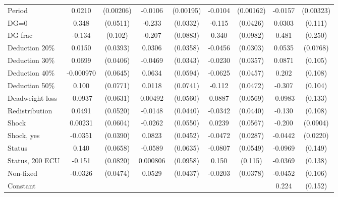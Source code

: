 \begin{tabular}{l|cccccc|cc}
Period          &   0.0210\sym{***}&(0.00206)&  -0.0106\sym{***}&(0.00195)&  -0.0104\sym{***}&(0.00162)&  -0.0157\sym{***}&(0.00323)\\
DG=0          &    0.348\sym{***}& (0.0511)&   -0.233\sym{***}& (0.0332)&   -0.115\sym{***}& (0.0426)&   0.0303         &  (0.111)\\
DG frac         &   -0.134         &  (0.102)&   -0.207\sym{**} & (0.0883)&    0.340\sym{***}& (0.0982)&    0.481\sym{*}  &  (0.250)\\
Deduction 20\%&   0.0150         & (0.0393)&   0.0306         & (0.0358)&  -0.0456         & (0.0303)&   0.0535         & (0.0768)\\
Deduction 30\%&   0.0699\sym{*}  & (0.0406)&  -0.0469         & (0.0343)&  -0.0230         & (0.0357)&   0.0871         &  (0.105)\\
Deduction 40\%&-0.000970         & (0.0645)&   0.0634         & (0.0594)&  -0.0625         & (0.0457)&    0.202\sym{*}  &  (0.108)\\
Deduction 50\%&    0.100         & (0.0771)&   0.0118         & (0.0741)&   -0.112\sym{**} & (0.0472)&   -0.307\sym{***}&  (0.104)\\
Deadweight loss&  -0.0937         & (0.0631)&  0.00492         & (0.0560)&   0.0887         & (0.0569)&  -0.0983         &  (0.133)\\
Redistribution&   0.0491         & (0.0520)&  -0.0148         & (0.0440)&  -0.0342         & (0.0440)&   -0.130         &  (0.108)\\
Shock         &  0.00231         & (0.0604)&  -0.0262         & (0.0550)&   0.0239         & (0.0567)&   -0.200\sym{**} & (0.0904)\\
Shock, yes    &  -0.0351         & (0.0390)&   0.0823\sym{*}  & (0.0452)&  -0.0472         & (0.0287)&  -0.0442\sym{**} & (0.0220)\\
Status        &    0.140\sym{**} & (0.0658)&  -0.0589         & (0.0635)&  -0.0807         & (0.0549)&  -0.0969         &  (0.149)\\
Status, 200 ECU&   -0.151\sym{*}  & (0.0820)& 0.000806         & (0.0958)&    0.150         &  (0.115)&  -0.0369         &  (0.138)\\
Non-fixed     &  -0.0326         & (0.0474)&   0.0529         & (0.0437)&  -0.0203         & (0.0378)&  -0.0452         &  (0.106)\\
Constant        &                  &         &                  &         &                  &         &    0.224         &  (0.152)\\

\end{tabular}
